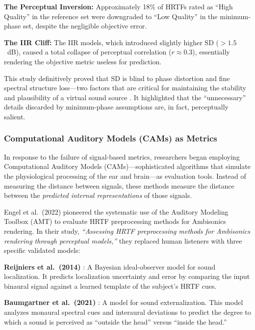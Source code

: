 \documentclass[12pt,a4paper]{article}
\begin{document}
\textbf{The Perceptual Inversion:} Approximately 18\% of HRTFs rated as ``High Quality'' in the reference set were downgraded to ``Low Quality'' in the minimum-phase set, despite the negligible objective error.

\textbf{The IIR Cliff:} The IIR models, which introduced slightly higher SD ($>1.5$~dB), caused a total collapse of perceptual correlation ($r \approx 0.3$), essentially rendering the objective metric useless for prediction.

This study definitively proved that SD is blind to phase distortion and fine spectral structure loss---two factors that are critical for maintaining the stability and plausibility of a virtual sound source \cite{andreopoulou2022}. It highlighted that the ``unnecessary'' details discarded by minimum-phase assumptions are, in fact, perceptually salient.

\subsubsection{Computational Auditory Models (CAMs) as Metrics}

In response to the failure of signal-based metrics, researchers began employing Computational Auditory Models (CAMs)---sophisticated algorithms that simulate the physiological processing of the ear and brain---as evaluation tools. Instead of measuring the distance between signals, these methods measure the distance between the \textit{predicted internal representations} of those signals.

Engel et al.\ (2022) \cite{engel2022} pioneered the systematic use of the Auditory Modeling Toolbox (AMT) to evaluate HRTF preprocessing methods for Ambisonics rendering. In their study, \textit{``Assessing HRTF preprocessing methods for Ambisonics rendering through perceptual models,''} they replaced human listeners with three specific validated models:

\textbf{Reijniers et al.\ (2014)} \cite{reijniers2014}: A Bayesian ideal-observer model for sound localization. It predicts localization uncertainty and error by comparing the input binaural signal against a learned template of the subject's HRTF cues.

\textbf{Baumgartner et al.\ (2021)} \cite{baumgartner2021}: A model for sound externalization. This model analyzes monaural spectral cues and interaural deviations to predict the degree to which a sound is perceived as ``outside the head'' versus ``inside the head.''
\end{document}
